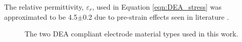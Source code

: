 The relative permittivity, $\varepsilon_r$, used in Equation \ref{eqn:DEA_stress} was approximated to be 4.5$\pm$0.2 due to pre-strain effects seen in literature\cite{Kofod2003, Choi2005, Wissler2007, Pan2015} .
\begin{figure}[H]
	\centering
	\hspace{1cm}
	\vspace{0.2cm}
	\caption{The two DEA compliant electrode material types used in this work.}
	\label{fig:DEAs}
\end{figure}

